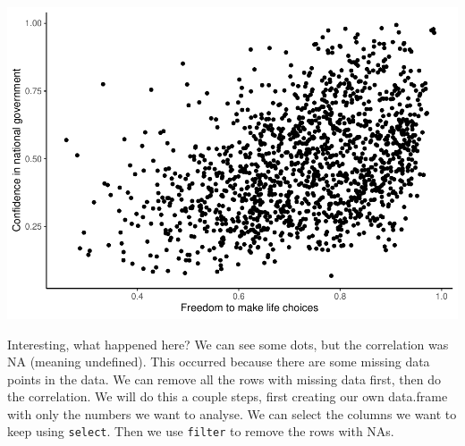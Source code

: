 \documentclass[]{book}
\newenvironment{Shaded}{\begin{snugshade}}{\end{snugshade}}
\newcommand{\KeywordTok}[1]{\textcolor[rgb]{0.13,0.29,0.53}{\textbf{#1}}}
\newcommand{\DataTypeTok}[1]{\textcolor[rgb]{0.13,0.29,0.53}{#1}}
\newcommand{\StringTok}[1]{\textcolor[rgb]{0.31,0.60,0.02}{#1}}
\newcommand{\OperatorTok}[1]{\textcolor[rgb]{0.81,0.36,0.00}{\textbf{#1}}}
\newcommand{\NormalTok}[1]{#1}
\begin{document}
\includegraphics{Statistics_Lab_files/figure-latex/unnamed-chunk-72-1.pdf}

Interesting, what happened here? We can see some dots, but the
correlation was NA (meaning undefined). This occurred because there are
some missing data points in the data. We can remove all the rows with
missing data first, then do the correlation. We will do this a couple
steps, first creating our own data.frame with only the numbers we want
to analyse. We can select the columns we want to keep using
\texttt{select}. Then we use \texttt{filter} to remove the rows with
NAs.

\begin{Shaded}
\end{Shaded}
\end{document}
